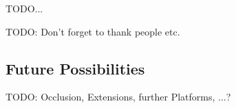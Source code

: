 TODO...

TODO: Don't forget to thank people etc.

\subsection{Future Possibilities}

TODO: Occlusion, Extensions, further Platforms, ...?
